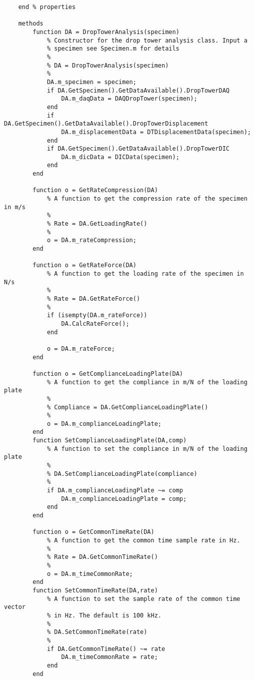 \begin{lstlisting}
    end % properties
    
    methods
        function DA = DropTowerAnalysis(specimen)
            % Constructor for the drop tower analysis class. Input a 
            % specimen see Specimen.m for details
            %
            % DA = DropTowerAnalysis(specimen)
            %
            DA.m_specimen = specimen;
            if DA.GetSpecimen().GetDataAvailable().DropTowerDAQ
                DA.m_daqData = DAQDropTower(specimen);
            end
            if DA.GetSpecimen().GetDataAvailable().DropTowerDisplacement
                DA.m_displacementData = DTDisplacementData(specimen);
            end
            if DA.GetSpecimen().GetDataAvailable().DropTowerDIC
                DA.m_dicData = DICData(specimen);
            end
        end
        
        function o = GetRateCompression(DA)
            % A function to get the compression rate of the specimen in m/s
            %
            % Rate = DA.GetLoadingRate()
            %
            o = DA.m_rateCompression;
        end
        
        function o = GetRateForce(DA)
            % A function to get the loading rate of the specimen in N/s
            %
            % Rate = DA.GetRateForce()
            %
            if (isempty(DA.m_rateForce))
                DA.CalcRateForce();
            end
            
            o = DA.m_rateForce;
        end
        
        function o = GetComplianceLoadingPlate(DA)
            % A function to get the compliance in m/N of the loading plate
            %
            % Compliance = DA.GetComplianceLoadingPlate()
            %
            o = DA.m_complianceLoadingPlate;
        end
        function SetComplianceLoadingPlate(DA,comp)
            % A function to set the compliance in m/N of the loading plate
            %
            % DA.SetComplianceLoadingPlate(compliance)
            %
            if DA.m_complianceLoadingPlate ~= comp
                DA.m_complianceLoadingPlate = comp;
            end
        end
        
        function o = GetCommonTimeRate(DA)
            % A function to get the common time sample rate in Hz.
            %
            % Rate = DA.GetCommonTimeRate()
            %
            o = DA.m_timeCommonRate;
        end
        function SetCommonTimeRate(DA,rate)
            % A function to set the sample rate of the common time vector
            % in Hz. The default is 100 kHz.
            %
            % DA.SetCommonTimeRate(rate)
            %
            if DA.GetCommonTimeRate() ~= rate
                DA.m_timeCommonRate = rate;
            end
        end
        

\end{lstlisting}
